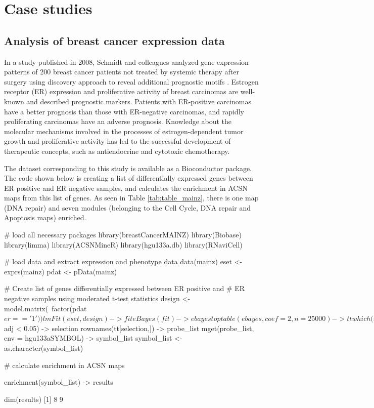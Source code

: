 \section[Case studies]{Case studies}

\subsection{Analysis of breast cancer expression data}
In a study published in 2008, Schmidt and colleagues analyzed gene expression
patterns of 200 breast cancer patients not treated by systemic therapy after
surgery using discovery approach to reveal additional prognostic motifs
\citep{schmidt2008humoral}. Estrogen receptor (ER) expression and proliferative
activity of breast carcinomas are well-known and described prognostic markers.
Patients with ER-positive carcinomas have a better prognosis than those with
ER-negative carcinomas, and rapidly proliferating carcinomas have an adverse
prognosis. Knowledge about the molecular mechanisms involved in the
processes of estrogen-dependent tumor growth and proliferative activity has led
to the successful development of therapeutic concepts, such as  antiendocrine and
cytotoxic chemotherapy. 

The dataset corresponding to this study is available as a Bioconductor package.
The code shown below is creating a list of differentially expressed genes
between ER positive and ER negative samples, and calculates the enrichment in
ACSN maps from this list of genes. As seen in Table \ref{tab:table_mainz},
there is one map (DNA repair) and seven modules (belonging to the Cell Cycle, DNA
repair and Apoptosis maps) enriched. 

\begin{example}
# load all necessary packages
library(breastCancerMAINZ)
library(Biobase)
library(limma)
library(ACSNMineR)
library(hgu133a.db)
library(RNaviCell)

# load data and extract expression and phenotype data 
data(mainz)
eset <- exprs(mainz)
pdat <- pData(mainz)

# Create list of genes differentially expressed between ER positive and 
# ER negative samples using moderated t-test statistics 
design <- model.matrix(~factor(pdat$er == '1'))
lmFit(eset, design) -> fit
eBayes(fit) -> ebayes
toptable(ebayes, coef=2,n=25000) -> tt
which(tt$adj < 0.05) -> selection
rownames(tt[selection,]) -> probe_list
mget(probe_list, env = hgu133aSYMBOL) -> symbol_list
symbol_list <- as.character(symbol_list)

# calculate enrichment in ACSN maps 

enrichment(symbol_list) -> results

dim(results)
[1] 8 9
\end{example}

